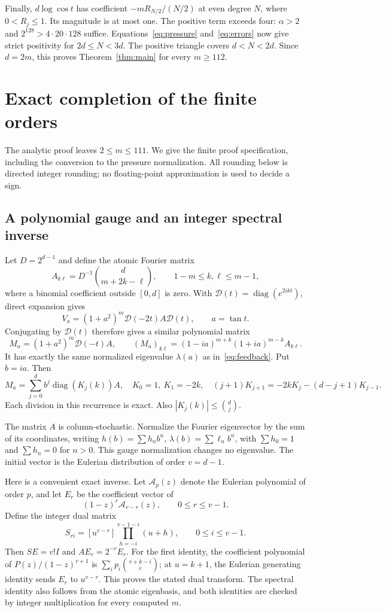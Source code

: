 \documentclass[11pt,a4paper]{article}
\theoremstyle{remark}\newtheorem*{ednote}{Editorial note (ProveIt, 2026-10-01)}
\begin{document}
Finally, $d\log\cos t$ has coefficient $-mR_{N/2}/(N/2)$ at even degree $N$, where $0<R_j\le1$. Its magnitude is at most one. The positive term exceeds four: $\alpha>2$ and $2^{128}>4\cdot20\cdot128$ suffice. Equations~\eqref{eq:pressure} and~\eqref{eq:errors} now give strict positivity for $2d\le N<3d$. The positive triangle covers $d<N<2d$. Since $d=2m$, this proves Theorem~\ref{thm:main} for every $m\ge112$.

\section{Exact completion of the finite orders}
The analytic proof leaves $2\le m\le111$. We give the finite proof specification, including the conversion to the pressure normalization. All rounding below is directed integer rounding; no floating-point approximation is used to decide a sign.

\subsection{A polynomial gauge and an integer spectral inverse}
Let $D=2^{d-1}$ and define the atomic Fourier matrix
\[
 A_{k\ell}=D^{-1}\binom d{m+2k-\ell},\qquad 1-m\le k,\ell\le m-1,
\]
where a binomial coefficient outside $[0,d]$ is zero. With $\mathcal D(t)=\operatorname{diag}(e^{2ikt})$, direct expansion gives
\[
 V_a=(1+a^2)^m\mathcal D(-2t)A\mathcal D(t),\qquad a=\tan t.
\]
Conjugating by $\mathcal D(t)$ therefore gives a similar polynomial matrix
\[
 M_a=(1+a^2)^m\mathcal D(-t)A,
 \qquad (M_a)_{k\ell}=(1-ia)^{m+k}(1+ia)^{m-k}A_{k\ell}.
\]
It has exactly the same normalized eigenvalue $\lambda(a)$ as in~\eqref{eq:feedback}. Put $b=ia$. Then
\[
 M_a=\sum_{j=0}^d b^j\operatorname{diag}(K_j(k))A,
 \quad K_0=1,\ K_1=-2k,\quad
 (j+1)K_{j+1}=-2kK_j-(d-j+1)K_{j-1}.
\]
Each division in this recurrence is exact. Also $|K_j(k)|\le\binom dj$.

The matrix $A$ is column-stochastic. Normalize the Fourier eigenvector by the sum of its coordinates, writing $h(b)=\sum h_n b^n$, $\lambda(b)=\sum\ell_n b^n$, with $\sum h_0=1$ and $\sum h_n=0$ for $n>0$. This gauge normalization changes no eigenvalue. The initial vector is the Eulerian distribution of order $v=d-1$.

Here is a convenient exact inverse. Let $\mathcal A_p(z)$ denote the Eulerian polynomial of order $p$, and let $E_r$ be the coefficient vector of
\[
 (1-z)^r\mathcal A_{v-r}(z),\qquad 0\le r\le v-1.
\]
Define the integer dual matrix
\[
 S_{ri}=[u^{v-r}]\prod_{h=-i}^{v-1-i}(u+h),\qquad 0\le i\le v-1.
\]
Then $SE=v!I$ and $AE_r=2^{-r}E_r$. For the first identity, the coefficient polynomial of $P(z)/(1-z)^{v+1}$ is
$\sum_i p_i\binom{v+k-i}{v}$; at $u=k+1$, the Eulerian generating identity sends $E_r$ to $u^{v-r}$. This proves the stated dual transform. The spectral identity also follows from the atomic eigenbasis, and both identities are checked by integer multiplication for every computed $m$.
\end{document}

